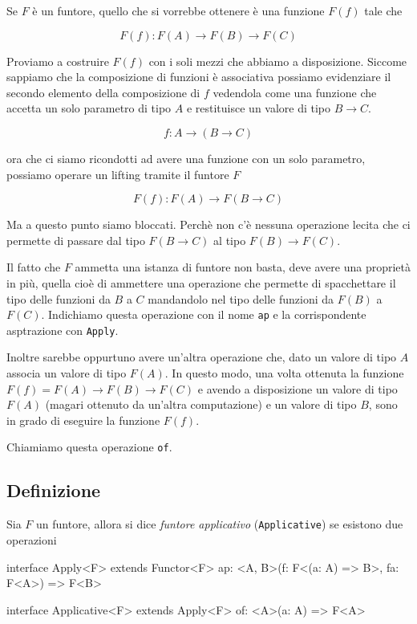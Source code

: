 \documentclass[12pt]{article}
\theoremstyle{definition}
\newenvironment{code}
  {\vspace{0.5cm} \VerbatimEnvironment\begin{typescriptcode}}
  {\end{typescriptcode} \vspace{0.2cm}}
\begin{document}
Se $F$ è un funtore, quello che si vorrebbe ottenere è una funzione $F(f)$ tale che

$$
F(f): F(A) \rightarrow F(B) \rightarrow F(C)
$$

Proviamo a costruire $F(f)$ con i soli mezzi che abbiamo a disposizione.
Siccome sappiamo che la composizione di funzioni è associativa possiamo evidenziare il secondo elemento della composizione di $f$
vedendola come una funzione che accetta un solo parametro di tipo $A$ e restituisce un valore di tipo $B \rightarrow C$.

$$
f: A \rightarrow (B \rightarrow C)
$$

ora che ci siamo ricondotti ad avere una funzione con un solo parametro, possiamo operare un lifting tramite il funtore $F$

$$
F(f): F(A) \rightarrow F(B \rightarrow C)
$$

Ma a questo punto siamo bloccati.
Perchè non c'è nessuna operazione lecita che ci permette di passare dal tipo $F(B \rightarrow C)$ al tipo $F(B) \rightarrow F(C)$.

Il fatto che $F$ ammetta una istanza di funtore non basta, deve avere una proprietà in più, quella cioè di ammettere una operazione che permette di
spacchettare il tipo delle funzioni da $B$ a $C$ mandandolo nel tipo delle funzioni da $F(B)$ a $F(C)$.
Indichiamo questa operazione con il nome \texttt{ap} e la corrispondente asptrazione con \texttt{Apply}.

Inoltre sarebbe oppurtuno avere un'altra operazione che, dato un valore di tipo $A$ associa un valore di tipo $F(A)$.
In questo modo, una volta ottenuta la funzione $F(f) = F(A) \rightarrow F(B) \rightarrow F(C)$ e avendo a disposizione un valore di tipo $F(A)$
(magari ottenuto da un'altra computazione) e un valore di tipo $B$, sono in grado di eseguire la funzione $F(f)$.

Chiamiamo questa operazione \texttt{of}.

\subsection{Definizione}

Sia $F$ un funtore, allora si dice \emph{funtore applicativo} (\texttt{Applicative}) se esistono due operazioni

\begin{code}
interface Apply<F> extends Functor<F> {
  ap: <A, B>(f: F<(a: A) => B>, fa: F<A>) => F<B>
}

interface Applicative<F> extends Apply<F> {
  of: <A>(a: A) => F<A>
}
\end{code}
\end{document}
